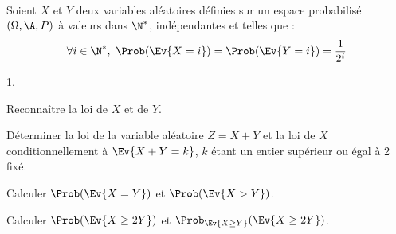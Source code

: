 \documentclass[11pt]{article}%
\begin{document}

\begin{exerciceSP}~\\
  Soient $X$ et $Y$ deux variables aléatoires définies sur un espace
  probabilisé $(\Omega , \A , P)$ à valeurs dans $\N^*$,
  indépendantes et telles que :
  \[
  \forall i \in \N^*, \ \Prob(\Ev{X=i}) = \Prob(\Ev{Y=i}) =
  \dfrac{1}{2^i}
  \] 
  \begin{noliste}{1.}
    \setlength{\itemsep}{2mm}
  \item Reconnaître la loi de $X$ et de $Y$.
  \item Déterminer la loi de la variable aléatoire $Z = X+Y$ et la loi
    de $X$ conditionnellement à $\Ev{X + Y = k}$, $k$ étant un entier
    supérieur ou égal à 2 fixé.
  \item Calculer $\Prob(\Ev{X = Y})$ et $\Prob(\Ev{X > Y})$.
  \item Calculer $\Prob(\Ev{X \geq 2 Y})$ et $\Prob_{\Ev{X \geq Y}}
    (\Ev{X \geq 2 Y})$.
  \end{noliste}
\end{exerciceSP}


\newpage



\end{document}

